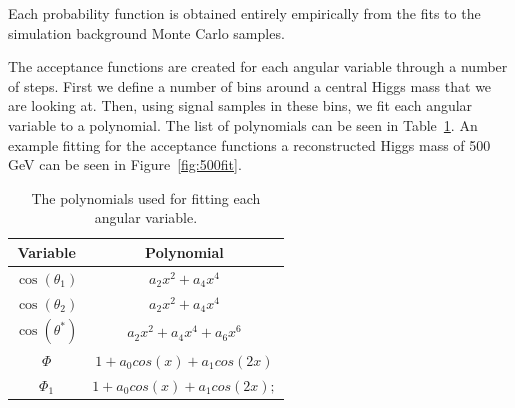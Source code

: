 Each probability function is obtained entirely empirically from the fits to the simulation background Monte Carlo samples.

The acceptance functions are created for each angular variable through a number of steps.  First we define a number of bins around a central Higgs mass that we are looking at.  Then, using signal samples in these bins, we fit each angular variable to a polynomial.  The list of polynomials can be seen in Table~\ref{tab:poly}.  An example fitting for the acceptance functions a reconstructed Higgs mass of 500 GeV can be seen in Figure~\ref{fig:500fit}.
\begin{center}
\begin{table}[htb]
\caption{%
  \small The polynomials used for fitting each angular variable.%
}
\begin{center}
\begin{tabular}{ c c }
Variable  & Polynomial \\ \hline
$\cos(\theta_1)$ & $a_2 x^2+a_4 x^4$ \\
$\cos(\theta_2)$ & $a_2 x^2+a_4 x^4$ \\
$\cos(\theta^*)$ & $a_2 x^2+a_4 x^4+a_6 x^6$\\
$\Phi$ &   $1 + a_0 cos(x) + a_1 cos(2x)$\\
$\Phi_1$ & $1 + a_0 cos(x) + a_1 cos(2x);$ \\
\end{tabular}
\end{center}
\label{tab:poly}
\end{table}
\end{center}
